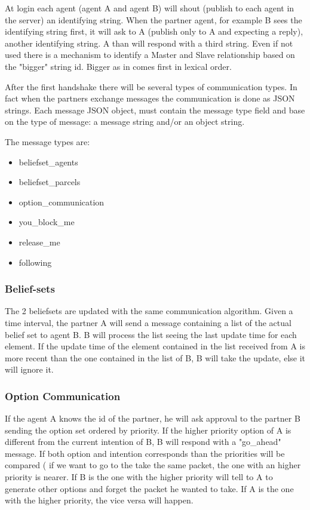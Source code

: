 \documentclass[conference]{IEEEtran}
\begin{document}
At login each agent (agent A and agent B) will shout (publish to each agent in the server) an identifying string.
When the partner agent, for example B sees the identifying string first, it will ask to A (publish only to A and expecting a reply), another identifying string. A than will respond with a third string. Even if not used there is a mechanism to identify a Master and Slave relationship based on the "bigger" string id. Bigger as in comes first in lexical order.

After the first handshake there will be several types of communication types.
In fact when the partners exchange messages the communication is done as JSON strings.
Each message JSON object, must contain the message type field and base on the type of message: a message string and/or an object string.

The message types are:
\begin{itemize}
    \item beliefset\_agents
    \item beliefset\_parcels
    \item option\_communication
    \item you\_block\_me
    \item release\_me
    \item following
\end{itemize}

\subsubsection{Belief-sets}
The 2 beliefsets are updated with the same communication algorithm.
Given a time interval, the partner A will send a message containing a list of the actual belief set to agent B. B will process the list seeing the last update time for each element. If the update time of the element contained in the list received from A is more recent than the one contained in the list of B, B will take the update, else it will ignore it.
\subsubsection{Option Communication}
If the agent A knows the id of the partner, he will ask approval to the partner B sending the option set ordered by priority.
If the higher priority option of A is different from the current intention of B, B will respond with a "go\_ahead" message. If both option and intention corresponds than the priorities will be compared ( if we want to go to the take the same packet, the one with an higher priority is nearer.
If B is the one with the higher priority will tell to A to generate other options and forget the packet he wanted to take.
If A is the one with the higher priority, the vice versa will happen.
\end{document}
